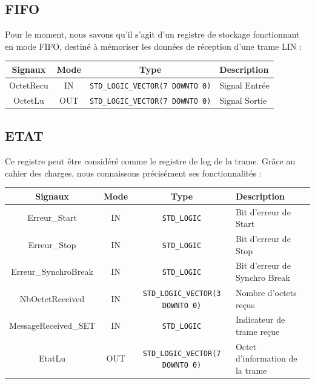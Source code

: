 \subsection{FIFO}

Pour le moment, nous savons qu'il s'agit d'un registre de stockage fonctionnant en mode FIFO, destiné à mémoriser les données de réception d'une trame LIN : 

\begin{center}
\renewcommand{\arraystretch}{1.2} %
\small %
\begin{tabularx}{\textwidth}{|c||c|c|X|}
    \hline
    \textbf{Signaux} & \textbf{Mode} & \textbf{Type} & \textbf{Description} \\ \hline
    OctetRecu & IN & \texttt{STD\_LOGIC\_VECTOR(7 DOWNTO 0)} & Signal Entrée \\
    OctetLu & OUT & \texttt{STD\_LOGIC\_VECTOR(7 DOWNTO 0)} & Signal Sortie \\
    \hline
\end{tabularx}
\end{center}

\subsection{ETAT}

Ce registre peut être considéré comme le registre de log de la trame. Grâce au cahier des charges, nous connaissons précisément ses fonctionnalités :

\begin{center}
\renewcommand{\arraystretch}{1.2} %
\small %
\begin{tabularx}{\textwidth}{|c||c|c|X|}
    \hline			
    \textbf{Signaux} & \textbf{Mode} & \textbf{Type} & \textbf{Description}  \\ \hline 
    Erreur\_Start & IN & \texttt{STD\_LOGIC} & Bit d'erreur de Start \\
    Erreur\_Stop & IN & \texttt{STD\_LOGIC} & Bit d'erreur de Stop \\
    Erreur\_SynchroBreak & IN & \texttt{STD\_LOGIC} & Bit d'erreur de Synchro Break \\
    NbOctetReceived & IN & \texttt{STD\_LOGIC\_VECTOR(3 DOWNTO 0)} & Nombre d'octets reçus \\
    MessageReceived\_SET & IN & \texttt{STD\_LOGIC} & Indicateur de trame reçue \\
    EtatLu & OUT & \texttt{STD\_LOGIC\_VECTOR(7 DOWNTO 0)} & Octet d'information de la trame \\
    \hline  
\end{tabularx}
\end{center}
